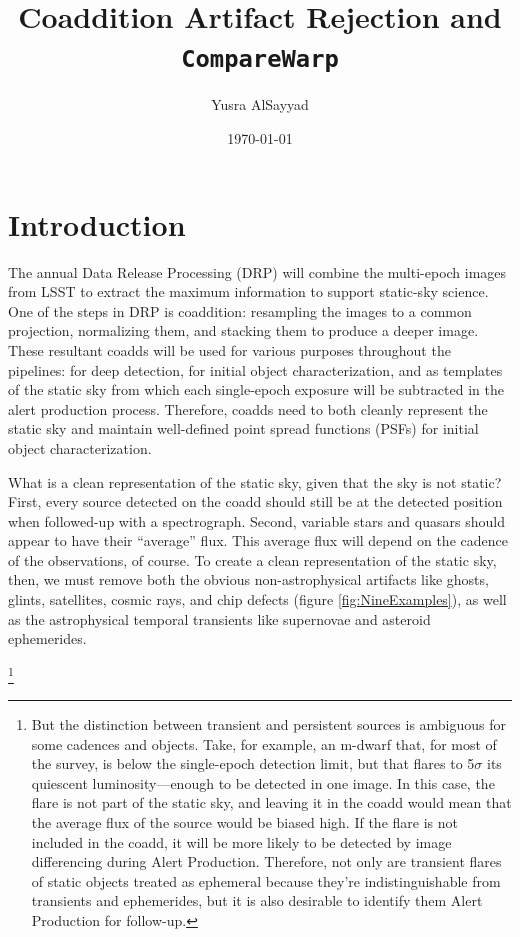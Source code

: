 \documentclass[DM,authoryear,toc]{lsstdoc}
\title{Coaddition Artifact Rejection and \texttt{CompareWarp}}
\author{%
Yusra AlSayyad
}
\date{\today}
\begin{document}
\maketitle


\section{Introduction}
The annual Data Release Processing (DRP) will combine the multi-epoch images from LSST to extract the maximum information to support static-sky science.
One of the steps in DRP is coaddition:  resampling the images to a common projection,  normalizing them, and stacking them to produce a deeper image.
These resultant coadds will be used for various purposes throughout the pipelines: for deep detection, for initial object characterization, and as templates of the static sky from which each single-epoch exposure will be subtracted in the alert production process.
Therefore, coadds need to both cleanly represent the static sky and  maintain well-defined point spread functions (PSFs) for initial object characterization.

What is a clean representation of the static sky, given that the sky is not static?
First, every source detected on the coadd should still be at the detected position when followed-up with a spectrograph.
Second, variable stars and quasars should appear to have their ``average'' flux.
This average flux will depend on the cadence of the observations, of course.
To create a clean representation of the static sky, then, we must remove both the obvious non-astrophysical artifacts like ghosts, glints, satellites, cosmic rays, and chip defects (figure \ref{fig:NineExamples}),  as well as the astrophysical temporal transients like supernovae and asteroid ephemerides.

\footnote{But the distinction between transient and persistent sources is ambiguous for some cadences and objects.
Take, for example, an m-dwarf that, for most of the survey, is below the single-epoch detection limit, but that flares to 5$\sigma$ its quiescent luminosity---enough to be detected in one image.
In this case, the flare is not part of the static sky, and leaving it in the coadd would mean that the average flux of the source would be biased high.
If the flare is not included in the coadd, it will be more likely to be detected by image differencing during Alert Production.
Therefore, not only are transient flares of static objects treated as ephemeral because they're indistinguishable from transients and ephemerides, but it is also desirable to identify them Alert Production for follow-up.}
\end{document}
